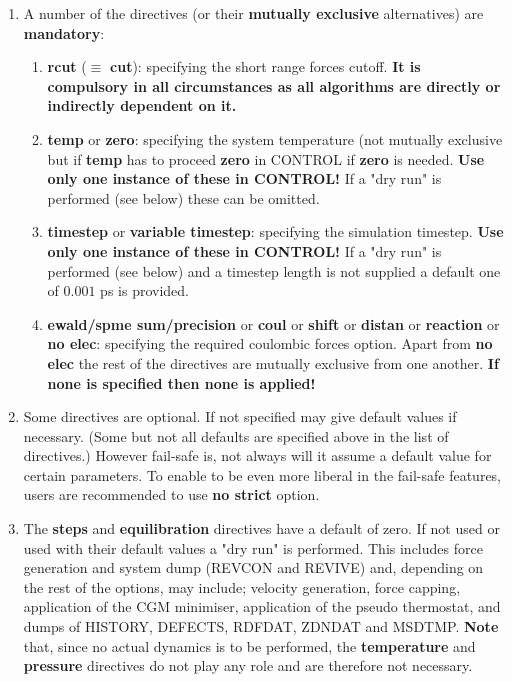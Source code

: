 \begin{enumerate}
\item A number of the directives (or their {\bf mutually
exclusive} alternatives) are {\bf mandatory}:
\begin{enumerate}
\item {\bf rcut} ($\equiv$ {\bf cut}): specifying the short range forces cutoff.
{\bf It is compulsory in all circumstances as all \D algorithms are
directly or indirectly dependent on it.}
\item {\bf temp} or {\bf zero}: specifying the system temperature
(not mutually exclusive but if {\bf temp} has to proceed
{\bf zero} in CONTROL if {\bf zero} is needed.  {\bf Use only one
instance of these in CONTROL!}  If a "dry run" is performed (see
below) these can be omitted.
\item {\bf timestep} or {\bf variable timestep}: specifying the
simulation timestep.  {\bf Use only one instance of these in
CONTROL!} If a "dry run" is performed (see below) and a timestep
length is not supplied a default one of $0.001$ ps is provided.
\item {\bf ewald/spme sum/precision} 
or {\bf coul} or {\bf shift} or {\bf distan} or {\bf reaction}
or {\bf no elec}: specifying the required coulombic forces
option.  Apart from {\bf no elec} the rest of the directives are
mutually exclusive from one another.  {\bf If none is specified
then none is applied!}
\end{enumerate}

\item Some directives are optional.  If not specified \D may give
default values if necessary.  (Some but not all defaults are specified
above in the list of directives.)  However fail-safe \D is, not always will
it assume a default value for certain parameters.  To enable \D to
be even more liberal in the fail-safe features, users are recommended
to use {\bf no strict} option.

\item The {\bf steps} and {\bf equilibration} directives have a
default of zero.  If not used or used with their default values a
"dry run" is performed.  This includes force generation and system
dump (REVCON and REVIVE) and, depending on the rest of the options,
may include; velocity generation, force capping, application of the
CGM minimiser, application of the pseudo thermostat, and dumps of
HISTORY, DEFECTS, RDFDAT, ZDNDAT and MSDTMP.  {\bf Note} that, since
no actual dynamics is to be performed, the {\bf temperature} and
{\bf pressure} directives do not play any role and are therefore
not necessary.


\end{enumerate}
